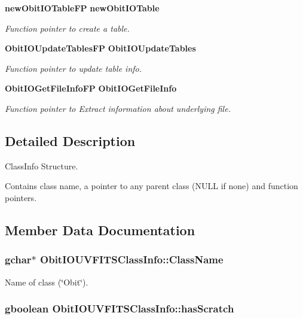 \begin{CompactItemize}
{\bf new\-Obit\-IOTable\-FP} {\bf new\-Obit\-IOTable}
\begin{CompactList}\small\item\em Function pointer to create a table. \item\end{CompactList}\item 
{\bf Obit\-IOUpdate\-Tables\-FP} {\bf Obit\-IOUpdate\-Tables}
\begin{CompactList}\small\item\em Function pointer to update table info. \item\end{CompactList}\item 
{\bf Obit\-IOGet\-File\-Info\-FP} {\bf Obit\-IOGet\-File\-Info}
\begin{CompactList}\small\item\em Function pointer to Extract information about underlying file. \item\end{CompactList}\end{CompactItemize}


\subsection{Detailed Description}
Class\-Info Structure. 

Contains class name, a pointer to any parent class (NULL if none) and function pointers. 



\subsection{Member Data Documentation}
\subsubsection{\setlength{\rightskip}{0pt plus 5cm}gchar$\ast$ {\bf Obit\-IOUVFITSClass\-Info::Class\-Name}}\label{structObitIOUVFITSClassInfo_o2}


Name of class (\char`\"{}Obit\char`\"{}). 

\subsubsection{\setlength{\rightskip}{0pt plus 5cm}gboolean {\bf Obit\-IOUVFITSClass\-Info::has\-Scratch}}\label{structObitIOUVFITSClassInfo_o1}


